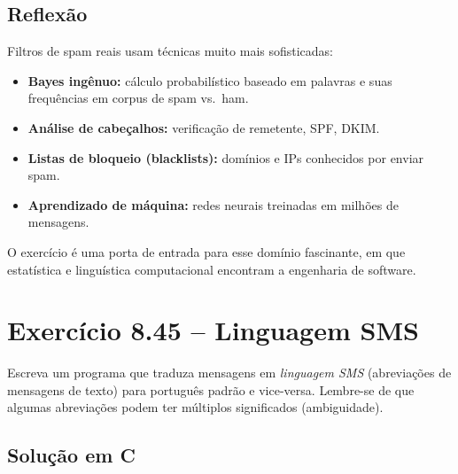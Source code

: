 \documentclass[12pt,a4paper]{article}
\begin{document}
\subsection*{Reflexão}

\begin{boaprática}
Filtros de spam reais usam técnicas muito mais sofisticadas:
\begin{itemize}[noitemsep]
  \item \textbf{Bayes ingênuo:} cálculo probabilístico baseado em palavras e suas frequências em corpus de spam vs.\ ham.
  \item \textbf{Análise de cabeçalhos:} verificação de remetente, SPF, DKIM.
  \item \textbf{Listas de bloqueio (blacklists):} domínios e IPs conhecidos por enviar spam.
  \item \textbf{Aprendizado de máquina:} redes neurais treinadas em milhões de mensagens.
\end{itemize}
O exercício é uma porta de entrada para esse domínio fascinante, em que estatística
e linguística computacional encontram a engenharia de software.
\end{boaprática}

\newpage

\section{Exercício 8.45 -- Linguagem SMS}

\begin{enunciadoBox}[Enunciado 8.45]
Escreva um programa que traduza mensagens em \textit{linguagem SMS} (abreviações
de mensagens de texto) para português padrão e vice-versa. Lembre-se de que
algumas abreviações podem ter múltiplos significados (ambiguidade).
\end{enunciadoBox}

\subsection*{Solução em C}
\end{document}
